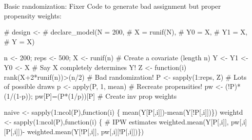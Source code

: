 \documentclass[
  11pt,
  ignorenonframetext,
]{beamer}
\newenvironment{Shaded}{\begin{snugshade}}{\end{snugshade}}
\newcommand{\CommentTok}[1]{\textcolor[rgb]{0.37,0.37,0.37}{#1}}
\newcommand{\ControlFlowTok}[1]{\textcolor[rgb]{0.00,0.23,0.31}{#1}}
\newcommand{\DecValTok}[1]{\textcolor[rgb]{0.68,0.00,0.00}{#1}}
\newcommand{\FunctionTok}[1]{\textcolor[rgb]{0.28,0.35,0.67}{#1}}
\newcommand{\NormalTok}[1]{\textcolor[rgb]{0.00,0.23,0.31}{#1}}
\newcommand{\OtherTok}[1]{\textcolor[rgb]{0.00,0.23,0.31}{#1}}
\newcommand{\SpecialCharTok}[1]{\textcolor[rgb]{0.37,0.37,0.37}{#1}}
\begin{document}
\begin{frame}[fragile]{Basic randomization: Fixer}
\protect\hypertarget{basic-randomization-fixer}{}
Code to generate bad assignment but proper propensity weights:

\begin{Shaded}
\begin{Highlighting}[]
\CommentTok{\# design \textless{}{-} }
\CommentTok{\#   declare\_model(N = 200,}
\CommentTok{\#                 X = runif(N),}
\CommentTok{\#                 Y0 = X,}
\CommentTok{\#                 Y1 = X,}
\CommentTok{\#                 Y = X)}

\NormalTok{n  }\OtherTok{\textless{}{-}} \DecValTok{200}\NormalTok{; reps }\OtherTok{\textless{}{-}} \DecValTok{500}\NormalTok{; X  }\OtherTok{\textless{}{-}} \FunctionTok{runif}\NormalTok{(n)     }\CommentTok{\# Create a covariate (length n)}
\NormalTok{Y  }\OtherTok{\textless{}{-}}\NormalTok{ Y1 }\OtherTok{\textless{}{-}}\NormalTok{ Y0 }\OtherTok{\textless{}{-}}\NormalTok{ X                        }\CommentTok{\# Say X completely determines Y!}
\NormalTok{Z  }\OtherTok{\textless{}{-}} \ControlFlowTok{function}\NormalTok{(i) }\FunctionTok{rank}\NormalTok{(X}\SpecialCharTok{+}\DecValTok{2}\SpecialCharTok{*}\FunctionTok{runif}\NormalTok{(n))}\SpecialCharTok{\textgreater{}}\NormalTok{(n}\SpecialCharTok{/}\DecValTok{2}\NormalTok{) }\CommentTok{\# Bad randomization! }
\NormalTok{P  }\OtherTok{\textless{}{-}} \FunctionTok{sapply}\NormalTok{(}\DecValTok{1}\SpecialCharTok{:}\NormalTok{reps, Z)                    }\CommentTok{\# Lots of possible draws}
\NormalTok{p  }\OtherTok{\textless{}{-}} \FunctionTok{apply}\NormalTok{(P, }\DecValTok{1}\NormalTok{, mean)                    }\CommentTok{\# Recreate propensities!}
\NormalTok{pw }\OtherTok{\textless{}{-}}\NormalTok{ (}\SpecialCharTok{!}\NormalTok{P)}\SpecialCharTok{*}\NormalTok{(}\DecValTok{1}\SpecialCharTok{/}\NormalTok{(}\DecValTok{1}\SpecialCharTok{{-}}\NormalTok{p)); pw[P]}\OtherTok{=}\NormalTok{(P}\SpecialCharTok{*}\NormalTok{(}\DecValTok{1}\SpecialCharTok{/}\NormalTok{p))[P]   }\CommentTok{\# Create inv prop weights}

\NormalTok{naive   }\OtherTok{\textless{}{-}} \FunctionTok{sapply}\NormalTok{(}\DecValTok{1}\SpecialCharTok{:}\FunctionTok{ncol}\NormalTok{(P),}\ControlFlowTok{function}\NormalTok{(i) \{}
              \FunctionTok{mean}\NormalTok{(Y[P[,i]])}\SpecialCharTok{{-}}\FunctionTok{mean}\NormalTok{(Y[}\SpecialCharTok{!}\NormalTok{P[,i]])\}) }
\NormalTok{weightd }\OtherTok{\textless{}{-}} \FunctionTok{sapply}\NormalTok{(}\DecValTok{1}\SpecialCharTok{:}\FunctionTok{ncol}\NormalTok{(P),}\ControlFlowTok{function}\NormalTok{(i) \{  }\CommentTok{\# IPW estimates}
              \FunctionTok{weighted.mean}\NormalTok{(Y[P[,i]],  pw[,i][P[,i]])}\SpecialCharTok{{-}}
              \FunctionTok{weighted.mean}\NormalTok{(Y[}\SpecialCharTok{!}\NormalTok{P[,i]], pw[,i][}\SpecialCharTok{!}\NormalTok{P[,i]])\}) }
\end{Highlighting}
\end{Shaded}
\end{frame}
\end{document}
